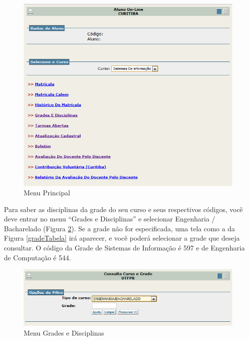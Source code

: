 \documentclass[a4paper,12pt,openany]{article}
\begin{document}
	\begin{figure}[ht!]  \centering
		\includegraphics[scale=0.6]{Menu_Principal_1.png}
		\caption{Menu Principal}
		\label{menuPrincipal}
	\end{figure}

Para saber as disciplinas da grade do seu curso e seus respectivos códigos, você deve entrar no menu ``Grades e Disciplinas'' e selecionar Engenharia / Bacharelado  (Figura  \ref{gradeMenu}). Se a grade não for especificada, uma tela como a da Figura  \ref{gradeTabela} irá aparecer, e você poderá selecionar a grade que deseja consultar. O código da Grade de Sistemas de Informação é 597 e de Engenharia de Computação é 544.

	\begin{figure}[ht!]  \centering
		\includegraphics[scale=0.8]{Grade_Menu.png}
		\caption{Menu Grades e Disciplinas}
		\label{gradeMenu}
	\end{figure}
\end{document}
